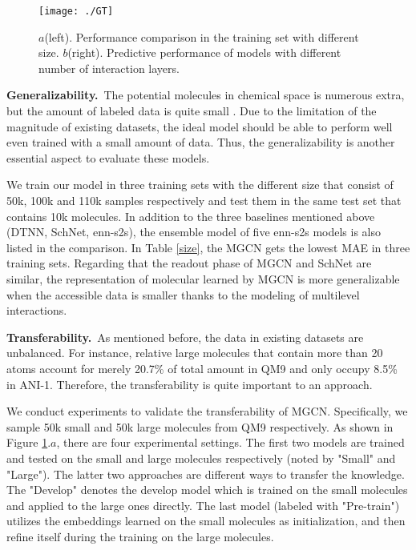 \documentclass[letterpaper]{article} \usepackage{bm}
\begin{document}
 
\begin{figure}[tpb]
    \centerline{\texttt{[image: ./GT]}}
    \caption{$a$(left). Performance comparison in the training set with different size. $b$(right). Predictive performance of models with different number of interaction layers.}
    \label{interaction}
\end{figure}

\textbf{Generalizability.}\ The potential molecules in chemical space is numerous extra, but the amount of labeled data is quite small \cite{schutt2017quantum}. Due to the limitation of the magnitude of existing datasets, the ideal model should be able to perform well even trained with a small amount of data. Thus, the generalizability is another essential aspect to evaluate these models.  

We train our model in three training sets with the different size that consist of 50k, 100k and 110k samples respectively and test them in the same test set that contains 10k molecules. In addition to the three baselines mentioned above (DTNN, SchNet, enn-s2s), the ensemble model of five enn-s2s models is also listed in the comparison. In Table \ref{size}, the MGCN gets the lowest MAE in three training sets. Regarding that the readout phase of MGCN and SchNet are similar, the representation of molecular learned by MGCN is more generalizable when the accessible data is smaller thanks to the modeling of multilevel interactions.   

\textbf{Transferability.}\ As mentioned before, the data in existing datasets are unbalanced. For instance, relative large molecules that contain more than 20 atoms account for merely 20.7\% of total amount in QM9 and only occupy 8.5\% in ANI-1. Therefore, the transferability is quite important to an approach.  

We conduct experiments to validate the transferability of MGCN. Specifically, we sample 50k small and 50k large molecules from QM9 respectively. As shown in Figure \ref{interaction}.$a$, there are four experimental settings. The first two models are trained and tested on the small and large molecules respectively (noted by "Small" and "Large"). The latter two approaches are different ways to transfer the knowledge. The "Develop" denotes the develop model which is trained on the small molecules and applied to the large ones directly. The last model (labeled with "Pre-train") utilizes the embeddings learned on the small molecules as initialization, and then refine itself during the training on the large molecules. 
\end{document}

